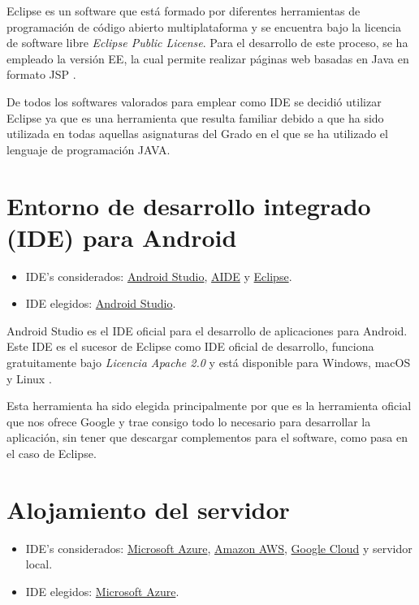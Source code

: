 Eclipse es un software que está formado por diferentes herramientas de programación de código abierto multiplataforma y se encuentra bajo la licencia de software libre \textit{Eclipse Public License}. Para el desarrollo de este proceso, se ha empleado la versión EE, la cual permite realizar páginas web basadas en Java en formato JSP \cite{eclipse:info}.

De todos los softwares valorados para emplear como IDE se decidió utilizar Eclipse ya que es una herramienta que resulta familiar debido a que ha sido utilizada en todas aquellas asignaturas del Grado en el que se ha utilizado el lenguaje de programación JAVA.


\section{Entorno de desarrollo integrado (IDE) para Android}

\begin{itemize}
	\tightlist
	\item
	IDE's considerados: \href{https://developer.android.com/studio/}{Android Studio}, \href{http://www.android-ide.com/}{AIDE} y \href{https://eclipse.org/}{Eclipse}.
	\item
	IDE elegidos: \href{https://developer.android.com/studio/}{Android Studio}.
\end{itemize}

Android Studio es el IDE oficial para el desarrollo de aplicaciones para Android. Este IDE es el sucesor de Eclipse como IDE oficial de desarrollo, funciona gratuitamente bajo \textit{Licencia Apache 2.0} y está disponible para Windows, macOS y Linux \cite{androidstudio:wiki}.

Esta herramienta ha sido elegida principalmente por que es la herramienta oficial que nos ofrece Google y trae consigo todo lo necesario para desarrollar la aplicación, sin tener que descargar complementos para el software, como pasa en el caso de Eclipse.

\section{Alojamiento del servidor}

\begin{itemize}
	\tightlist
	\item
	IDE's considerados: \href{https://azure.microsoft.com/es-es/}{Microsoft Azure}, \href{https://aws.amazon.com/es/}{Amazon AWS}, \href{https://cloud.google.com/}{Google Cloud} y servidor local.
	\item
	IDE elegidos: \href{https://azure.microsoft.com/es-es/}{Microsoft Azure}.
\end{itemize}

